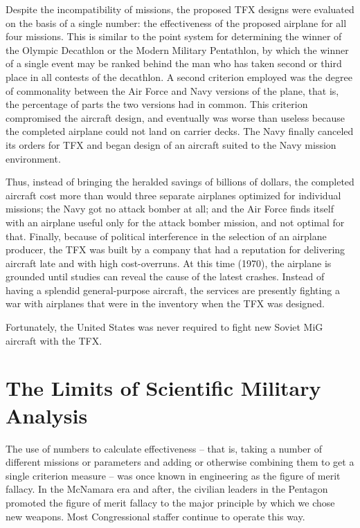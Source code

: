 Despite the incompatibility of missions, the proposed TFX designs were evaluated on the basis of a single number: the effectiveness of the proposed airplane for all four missions. This is similar to the point system for determining the winner of the Olympic Decathlon or the Modern Military Pentathlon, by which the winner of a single event may be ranked behind the man who has taken second or third place in all contests of the decathlon. A second criterion employed was the degree of commonality between the Air Force and Navy versions of the plane, that is, the percentage of parts the two versions had in common. This criterion compromised the aircraft design, and eventually was worse than useless because the completed airplane could not land on carrier decks. The Navy finally canceled its orders for TFX and began design of an aircraft suited to the Navy mission environment.

Thus, instead of bringing the heralded savings of billions of dollars, the completed aircraft cost more than would three separate airplanes optimized for individual missions; the Navy got no attack bomber at all; and the Air Force finds itself with an airplane useful only for the attack bomber mission, and not optimal for that. Finally, because of political interference in the selection of an airplane producer, the TFX was built by a company that had a reputation for delivering aircraft late and with high cost-overruns. At this time (1970), the airplane is grounded until studies can reveal the cause of the latest crashes. Instead of having a splendid general-purpose aircraft, the services are presently fighting a war with airplanes that were in the inventory when the TFX was designed.

Fortunately, the United States was never required to fight new Soviet MiG aircraft with the TFX.

\section{The Limits of Scientific Military Analysis}
The use of numbers to calculate effectiveness -- that is, taking a number of different missions or parameters and adding or otherwise combining them to get a single criterion measure -- was once known in engineering as the figure of merit fallacy. In the McNamara era and after, the civilian leaders in the Pentagon promoted the figure of merit fallacy to the major principle by which we chose new weapons. Most Congressional staffer continue to operate this way.

